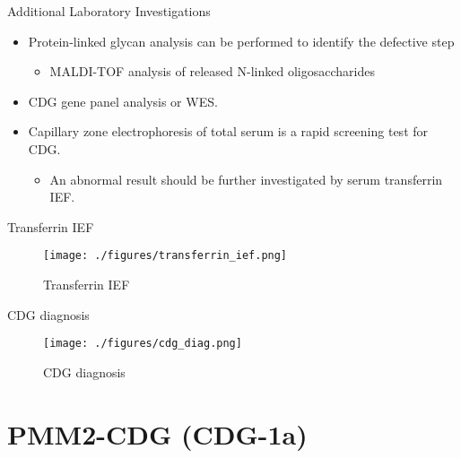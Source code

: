 \documentclass[presentation, smaller]{beamer}
\begin{document}
\begin{frame}[label={sec:org97f57ce}]{Additional Laboratory Investigations}
\begin{itemize}
\item Protein-linked glycan analysis can be performed to identify the defective step
\begin{itemize}
\item MALDI-TOF analysis of released N-linked oligosaccharides
\end{itemize}
\item CDG gene panel analysis or WES.

\item Capillary zone electrophoresis of total serum is a rapid screening
test for CDG.
\begin{itemize}
\item An abnormal result should be further investigated by serum
transferrin IEF.
\end{itemize}
\end{itemize}
\end{frame}

\begin{frame}[label={sec:org96e6929}]{Transferrin IEF}
\begin{figure}[htbp]
\centering
\texttt{[image: ./figures/transferrin\_ief.png]}
\caption{\label{fig:org7f9b69b}
Transferrin IEF}
\end{figure}
\end{frame}


\begin{frame}[label={sec:orga513b53}]{CDG diagnosis}
\begin{figure}[htbp]
\centering
\texttt{[image: ./figures/cdg\_diag.png]}
\caption{\label{fig:orgbd672c5}
CDG diagnosis}
\end{figure}
\end{frame}


\section{PMM2-CDG (CDG-1a)}
\label{sec:org6cc5ee0}
\end{document}

